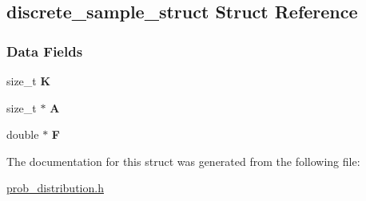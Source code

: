 \hypertarget{structdiscrete__sample__struct}{}\subsection{discrete\+\_\+sample\+\_\+struct Struct Reference}
\label{structdiscrete__sample__struct}
\subsubsection*{Data Fields}
\begin{DoxyCompactItemize}
\item 
\mbox{\label{structdiscrete__sample__struct_a84d1ed2d711d3c8877bbf5586e251f17}} 
size\+\_\+t {\bfseries K}
\item 
\mbox{\label{structdiscrete__sample__struct_a17af7306fbae4bee7ba2b4a729785e3d}} 
size\+\_\+t $\ast$ {\bfseries A}
\item 
\mbox{\label{structdiscrete__sample__struct_a21b0ba6ce6f22d95868f2a9f2ebe7c6b}} 
double $\ast$ {\bfseries F}
\end{DoxyCompactItemize}


The documentation for this struct was generated from the following file\+:\begin{DoxyCompactItemize}
\item 
\hyperlink{prob__distribution_8h}{prob\+\_\+distribution.\+h}\end{DoxyCompactItemize}
